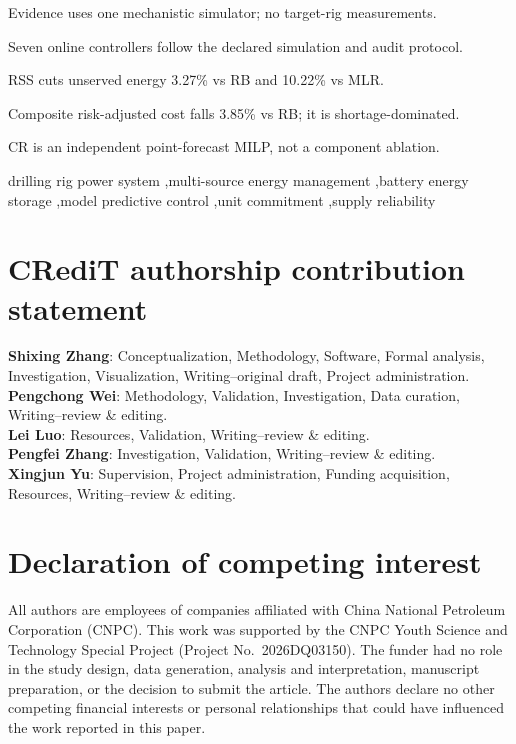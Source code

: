 \documentclass[preprint,12pt]{elsarticle}
\DeclareRobustCommand{\?}[1]{\u{#1}}
\DeclareRobustCommand{\>}[1]{\c{#1}}
\begin{document}
\begin{frontmatter}
\begin{highlights}
\item Evidence uses one mechanistic simulator; no target-rig measurements.
\item Seven online controllers follow the declared simulation and audit protocol.
\item RSS cuts unserved energy 3.27\% vs RB and 10.22\% vs MLR.
\item Composite risk-adjusted cost falls 3.85\% vs RB; it is shortage-dominated.
\item CR is an independent point-forecast MILP, not a component ablation.
\end{highlights}

\begin{keyword}
drilling rig power system \sep multi-source energy management \sep battery energy storage \sep model predictive control \sep unit commitment \sep supply reliability
\end{keyword}

\end{frontmatter}



\section*{CRediT authorship contribution statement}
\noindent\textbf{Shixing Zhang}: Conceptualization, Methodology, Software,
Formal analysis, Investigation, Visualization, Writing--original draft, Project
administration.\\
\textbf{Pengchong Wei}: Methodology, Validation, Investigation, Data curation,
Writing--review \& editing.\\
\textbf{Lei Luo}: Resources, Validation, Writing--review \& editing.\\
\textbf{Pengfei Zhang}: Investigation, Validation, Writing--review \& editing.\\
\textbf{Xingjun Yu}: Supervision, Project administration, Funding acquisition,
Resources, Writing--review \& editing.

\section*{Declaration of competing interest}
All authors are employees of companies affiliated with China National Petroleum
Corporation (CNPC). This work was supported by the CNPC Youth Science and
Technology Special Project (Project No.~2026DQ03150). The funder had no role in
the study design, data generation, analysis and interpretation, manuscript
preparation, or the decision to submit the article. The authors declare no other
competing financial interests or personal relationships that could have
influenced the work reported in this paper.
\end{document}
